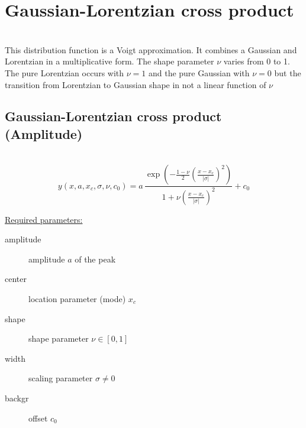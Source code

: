 \clearpage
\section{Gaussian-Lorentzian cross product} ~\\
\label{sec:GaussianLorentzianCrossProduct}
This distribution function is a Voigt approximation. It combines a Gaussian and Lorentzian
in a multiplicative form. The shape parameter $\nu$ varies from 0 to 1. The pure
Lorentzian occurs with $\nu=1$ and the pure Gaussian with $\nu=0$ but the transition from
Lorentzian to Gaussian shape in not a linear function of $\nu$

\vspace{5mm} \clearpage

\subsection{Gaussian-Lorentzian cross product (Amplitude)} ~\\
\label{sec:GaussianLorentzianCrossProductAmplitude}
\begin{equation}
y(x,a,x_c,\sigma,\nu,c_0) = a\,
\frac{\exp\left(-\frac{1-\nu}{2}\left(\frac{x-x_c}{|\sigma|}\right)^2\right)}{1+\nu\left(\frac{x-x_c}{|\sigma|}\right)^2}+c_0
\end{equation}
\vspace{5mm}

\uline{Required parameters:}
\begin{description}
    \item[amplitude] amplitude $a$ of the peak
    \item[center] location parameter (mode) $x_c$
    \item[shape] shape parameter $\nu\in [0,1]$
    \item[width] scaling parameter $\sigma \neq 0$
    \item[backgr] offset $c_0$
\end{description}

